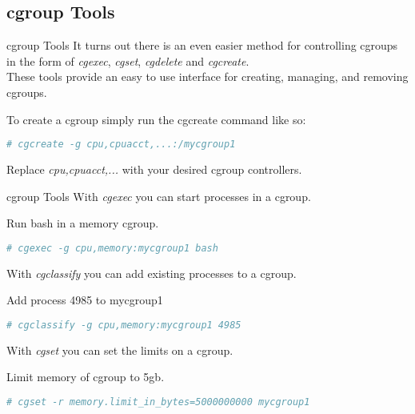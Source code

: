 \documentclass[pdf]{beamer}
\begin{document}
\subsection{cgroup Tools}
\begin{frame}[fragile]{cgroup Tools}
It turns out there is an even easier method for controlling cgroups in the form of \textit{cgexec}, \textit{cgset}, \textit{cgdelete} and \textit{cgcreate}.\\ 


These tools provide an easy to use interface for creating, managing, and removing cgroups.


\begin{block}{To create a cgroup simply run the cgcreate command like so:}
\begin{lstlisting}[language=bash,keywordstyle=\bf,stringstyle=\it,basicstyle=\tiny]
# cgcreate -g cpu,cpuacct,...:/mycgroup1
\end{lstlisting}
\end{block}

Replace \textit{cpu,cpuacct,...} with your desired cgroup controllers. 
\end{frame}

\begin{frame}[fragile]{cgroup Tools}
With \textit{cgexec} you can start processes in a cgroup.


\begin{block}{Run bash in a memory cgroup.}
\begin{lstlisting}[language=bash,keywordstyle=\bf,stringstyle=\it,basicstyle=\tiny]
# cgexec -g cpu,memory:mycgroup1 bash
\end{lstlisting}
\end{block}
 
With \textit{cgclassify} you can add existing processes to a cgroup.

\begin{block}{Add process 4985 to mycgroup1 }
\begin{lstlisting}[language=bash,keywordstyle=\bf,stringstyle=\it,basicstyle=\tiny]
# cgclassify -g cpu,memory:mycgroup1 4985
\end{lstlisting}
\end{block}



With \textit{cgset} you can set the limits on a cgroup.

\begin{block}{Limit memory of cgroup to 5gb. }
\begin{lstlisting}[language=bash,keywordstyle=\bf,stringstyle=\it,basicstyle=\tiny]
# cgset -r memory.limit_in_bytes=5000000000 mycgroup1
\end{lstlisting}
\end{block}
\end{frame}
\end{document}
